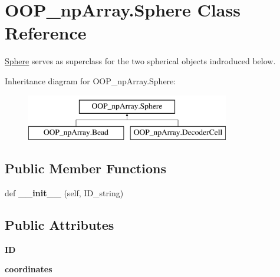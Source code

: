 \hypertarget{class_o_o_p__np_array_1_1_sphere}{}\section{O\+O\+P\+\_\+np\+Array.\+Sphere Class Reference}
\label{class_o_o_p__np_array_1_1_sphere}


\mbox{\hyperlink{class_o_o_p__np_array_1_1_sphere}{Sphere}} serves as superclass for the two spherical objects indroduced below.  


Inheritance diagram for O\+O\+P\+\_\+np\+Array.\+Sphere\+:\begin{figure}[H]
\begin{center}
\leavevmode
\includegraphics[height=2.000000cm]{class_o_o_p__np_array_1_1_sphere}
\end{center}
\end{figure}
\subsection*{Public Member Functions}
\begin{DoxyCompactItemize}
\item 
\mbox{\label{class_o_o_p__np_array_1_1_sphere_a5885b15f6bcd60c64ddb557e21dbff3f}} 
def {\bfseries \+\_\+\+\_\+init\+\_\+\+\_\+} (self, I\+D\+\_\+string)
\end{DoxyCompactItemize}
\subsection*{Public Attributes}
\begin{DoxyCompactItemize}
\item 
\mbox{\label{class_o_o_p__np_array_1_1_sphere_ab9142543fa0581404e28c131cc5b8541}} 
{\bfseries ID}
\item 
\mbox{\label{class_o_o_p__np_array_1_1_sphere_a27390f074435cb70bdfa9f3f4495270f}} 
{\bfseries coordinates}
\end{DoxyCompactItemize}


